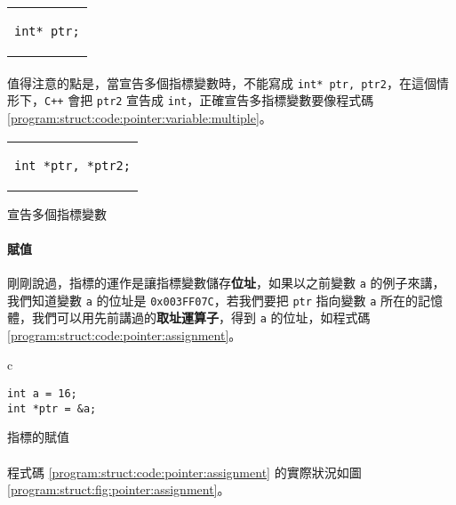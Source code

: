 \documentclass[12pt,a4paper,oneside]{article}
\begin{document}
\begin{CJK}{UTF8}{bkai}
\begin{code}[h!]
\centering
\begin{tabular}{c}
\begin{lstlisting}
int* ptr;
\end{lstlisting}
\end{tabular}
\caption{宣告指標變數 \lstinline!ptr!}
\label{program:struct:code:pointer:variable:another}
\end{code}

\paragraph{}值得注意的點是，當宣告多個指標變數時，不能寫成 \lstinline!int* ptr, ptr2!，在這個情形下，\texttt{C++} 會把 \lstinline!ptr2! 宣告成 \lstinline!int!，正確宣告多指標變數要像程式碼 \ref{program:struct:code:pointer:variable:multiple}。

\begin{code}[h!]
\centering
\begin{tabular}{c}
\begin{lstlisting}
int *ptr, *ptr2;
\end{lstlisting}
\end{tabular}
\caption{宣告多個指標變數}
\label{program:struct:code:pointer:variable:multiple}
\end{code}

\paragraph{賦值}剛剛說過，指標的運作是讓指標變數儲存\textbf{位址}，如果以之前變數 \lstinline!a! 的例子來講，我們知道變數 \lstinline!a! 的位址是 \texttt{0x003FF07C}，若我們要把 \lstinline!ptr! 指向變數 \lstinline!a! 所在的記憶體，我們可以用先前講過的\textbf{取址運算子}，得到 \lstinline!a! 的位址，如程式碼 \ref{program:struct:code:pointer:assignment}。

\begin{code}[h!]
\centering
\begin{tabular}{c}
\begin{lstlisting}
int a = 16;
int *ptr = &a;
\end{lstlisting}
\end{tabular}
\caption{指標的賦值}
\label{program:struct:code:pointer:assignment}
\end{code}

\paragraph{}程式碼 \ref{program:struct:code:pointer:assignment} 的實際狀況如圖 \ref{program:struct:fig:pointer:assignment}。


\end{CJK}
\end{document}
